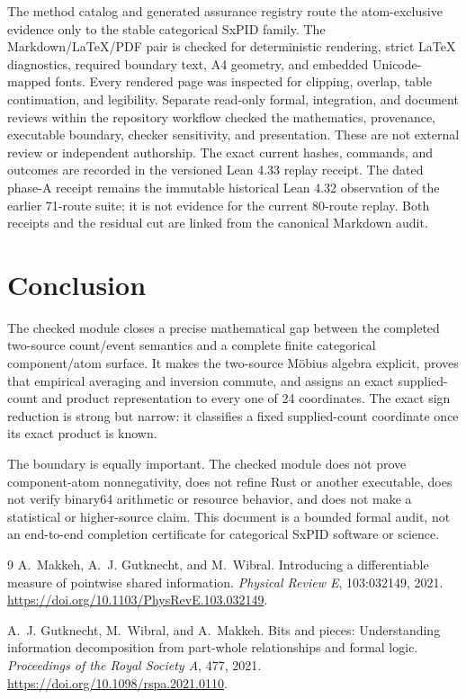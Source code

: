 \documentclass[11pt]{article}
\theoremstyle{definition}
\begin{document}
The method catalog and generated assurance registry route the atom-exclusive evidence only to
the stable categorical SxPID family.  The Markdown/LaTeX/PDF pair is checked for deterministic rendering,
strict LaTeX diagnostics, required boundary text, A4 geometry, and embedded Unicode-mapped fonts.
Every rendered page was inspected for clipping, overlap, table continuation, and legibility.
Separate read-only formal, integration, and document reviews within the repository workflow
checked the mathematics, provenance, executable boundary, checker sensitivity, and presentation.
These are not external review or independent authorship.  The exact current hashes, commands, and
outcomes are recorded in the versioned Lean 4.33 replay receipt.  The dated phase-A receipt remains
the immutable historical Lean 4.32 observation of the earlier 71-route suite; it is not evidence
for the current 80-route replay.  Both receipts and the residual cut are linked from the canonical
Markdown audit.

\section{Conclusion}

The checked module closes a precise mathematical gap between the completed two-source count/event
semantics and a complete finite categorical component/atom surface.  It makes the two-source
M\"obius algebra explicit, proves that empirical averaging and inversion commute, and assigns an
exact supplied-count and product representation to every one of 24 coordinates.  The exact sign
reduction is strong but narrow: it classifies a fixed supplied-count coordinate once its exact
product is known.

The boundary is equally important.  The checked module does not prove component-atom nonnegativity,
does not refine Rust or another executable, does not verify binary64 arithmetic or resource
behavior, and does not make a statistical or higher-source claim.  This document is a bounded
formal audit, not an end-to-end completion certificate for categorical SxPID software or science.

\begingroup
\enlargethispage{0.5\baselineskip}
\footnotesize
\begin{thebibliography}{9}
\setlength{\itemsep}{0.35\baselineskip}
A.~Makkeh, A.~J. Gutknecht, and M.~Wibral.
Introducing a differentiable measure of pointwise shared information.
\emph{Physical Review E}, 103:032149, 2021.
\url{https://doi.org/10.1103/PhysRevE.103.032149}.

A.~J. Gutknecht, M.~Wibral, and A.~Makkeh.
Bits and pieces: Understanding information decomposition from part-whole relationships and formal
logic.
\emph{Proceedings of the Royal Society A}, 477, 2021.
\url{https://doi.org/10.1098/rspa.2021.0110}.
\end{thebibliography}
\endgroup
\end{document}
